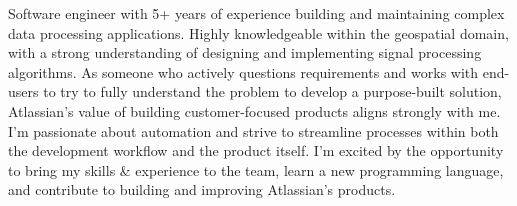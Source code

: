 \begin{justify}
Software engineer with 5+ years of experience building and maintaining complex data processing applications. Highly knowledgeable within the geospatial domain, with a strong understanding of designing and implementing signal processing algorithms. As someone who actively questions requirements and works with end-users to try to fully understand the problem to develop a purpose-built solution, Atlassian's value of building customer-focused products aligns strongly with me. I'm passionate about automation and strive to streamline processes within both the development workflow and the product itself. I'm excited by the opportunity to bring my skills \& experience to the team, learn a new programming language, and contribute to building and improving Atlassian's products.
\end{justify}